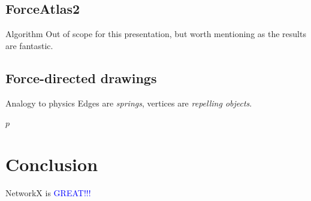 \documentclass[11pt]{beamer}
\begin{document}
\subsection{ForceAtlas2}
\begin{frame}{\subsecname}
    \begin{block}{Algorithm}
        Out of scope for this presentation, but worth mentioning as the results
        are fantastic.
    \end{block}

    \pause
    \resizebox{0.8\textwidth}{!}{}
\end{frame}

\subsection{Force-directed drawings}
\begin{frame}{\subsecname}
    \begin{block}{Analogy to physics}
        \small Edges are \textit{springs}, vertices are \textit{repelling objects}.
    \end{block}
    \pause
    \begin{block}{}
        \scriptsize
        \begin{algorithmic}
                \State \Return $p$
            \EndFunction
        \end{algorithmic}
    \end{block}
\end{frame}

\section{Conclusion}
\begin{frame}{\secname}
    \begin{block}{}
        NetworkX is \Huge\textcolor{blue}{GREAT!!!}
    \end{block}
\end{frame}
\end{document}
